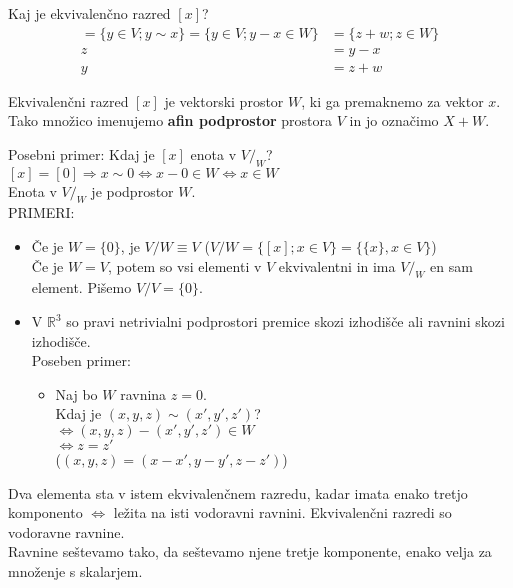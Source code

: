 \documentclass[a4paper,12pt]{article}
\begin{document}
Kaj je ekvivalenčno razred $[x]$? \\
\begin{align*}
[x]=\{y\in V; y\sim x\}=\{y\in V; y-x\in W\}&=\{z+w;z\in W\}\\
z&=y-x \\
y&=z+w
\end{align*}

Ekvivalenčni razred $[x]$ je vektorski prostor $W$, ki ga premaknemo za vektor $x$. Tako množico imenujemo \textbf{afin podprostor} prostora $V$ in jo označimo $X+W$.

\newpage

Posebni primer: Kdaj je $[x]$ enota v $V/_W$? \\

$[x]=[0]\Rightarrow x\sim 0 \Leftrightarrow x-0 \in W \Leftrightarrow x\in W$ \\

Enota v $V/_W$ je podprostor $W$. \\

PRIMERI:
\begin{itemize}
	\item Če je $W=\{0\}$, je $V/W \equiv V$ ($V/W=\{[x];x\in V\}=\{\{x\},x\in V\}$) \\
	Če je $W=V$, potem so vsi elementi v $V$ ekvivalentni in ima $V/_W$ en sam element. Pišemo $V/V=\{0\}$.
	\item V $\mathbb{R}^3$ so pravi netrivialni podprostori premice skozi izhodišče ali ravnini skozi izhodišče. \\
	Poseben primer: 
	\begin{itemize}
		\item Naj bo $W$ ravnina $z=0$. \\
		Kdaj je $(x,y,z)\sim(x',y',z')$? \\
		$\Leftrightarrow (x,y,z)-(x',y',z')\in W$ \\
		$\Leftrightarrow z=z'$ \\
		($(x,y,z)=(x-x',y-y',z-z')$)\\
	\end{itemize}
\end{itemize}

Dva elementa sta v istem ekvivalenčnem razredu, kadar imata enako tretjo komponento $\Leftrightarrow$ ležita na isti vodoravni ravnini. Ekvivalenčni razredi so vodoravne ravnine.\\

Ravnine seštevamo tako, da seštevamo njene tretje komponente, enako velja za množenje s skalarjem.\\
\end{document}
